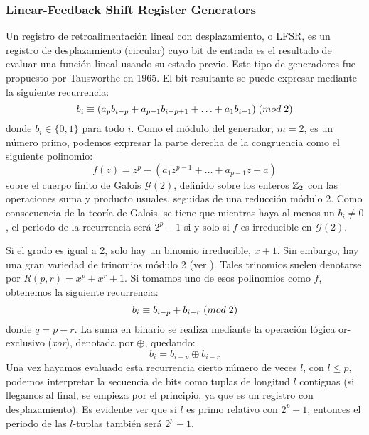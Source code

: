 
\subsubsection{Linear-Feedback Shift Register Generators}


Un registro de retroalimentación lineal con desplazamiento, o LFSR, es un registro de desplazamiento (circular) cuyo bit de entrada es el resultado de evaluar una función lineal usando su estado previo. Este tipo de generadores fue propuesto por Tausworthe en 1965. El bit resultante se puede expresar mediante la siguiente recurrencia:
\begin{equation}
b_i \equiv (a_{p}b_{i-p}+a_{p-1}b_{i-p+1}+\ldots+a_{1}b_{i-1}) \;(mod \; 2)
\end{equation}
donde $b_i\in\{0,1\}$ para todo $i$. Como el módulo del generador, $m=2$, es un número primo, podemos expresar la parte derecha de la congruencia como el siguiente polinomio:
\[
f(z)=z^p-(a_{1}z^{p-1}+\ldots+a_{p-1}z+a)
\]
sobre el cuerpo finito de Galois $\mathcal{G}(2)$, definido sobre los enteros $\mathbb{Z}_2$ con las operaciones suma y producto usuales, seguidas de una reducción módulo 2. Como consecuencia de la teoría de Galois, se tiene que mientras haya al menos un $b_i\neq 0$, el periodo de la recurrencia será $2^{p}-1$ si y solo si $f$ es irreducible en $\mathcal{G}(2)$.

Si el grado es igual a 2, solo hay un binomio irreducible, $x+1$. Sin embargo, hay una gran variedad de trinomios módulo 2 (ver \cite{zierler1969}). Tales trinomios suelen denotarse por $R(p,r)=x^p+x^r+1$. Si tomamos uno de esos polinomios como $f$, obtenemos la siguiente recurrencia:
\[
b_i \equiv b_{i-p}+b_{i-r} \;(mod \; 2)
\]
donde $q=p-r$. La suma en binario se realiza mediante la operación lógica or-exclusivo (\textit{xor}), denotada por $\oplus$, quedando:
\[
b_i=b_{i-p}\oplus b_{i-r}
\]Una vez hayamos evaluado esta recurrencia cierto número de veces $l$, con $l\leq p$, podemos interpretar la secuencia de bits como tuplas de longitud $l$ contiguas (si llegamos al final, se empieza por el principio, ya que es un registro con desplazamiento). Es evidente ver que si $l$ es primo relativo con $2^p-1$, entonces el periodo de las $l$-tuplas también será $2^p-1$.

